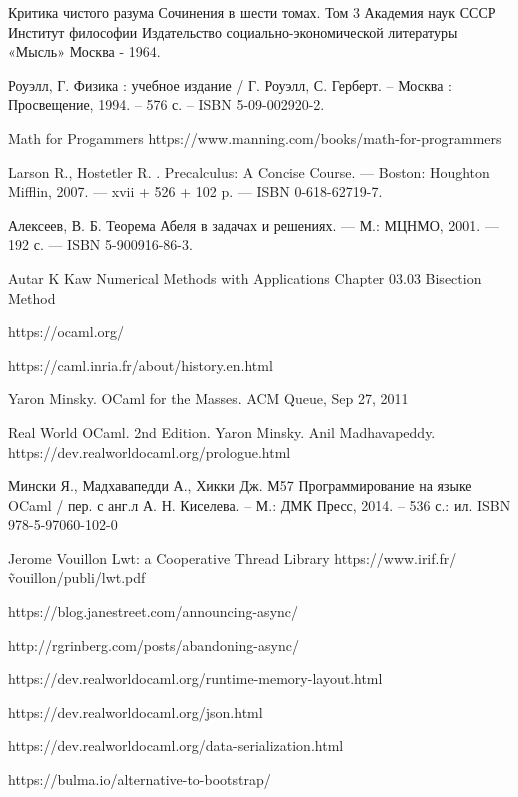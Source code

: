 \begingroup
\renewcommand{\section}[2]{\Anonchapter{Список использованных источников}\vspace{-1em}}
\begin{thebibliography}{00}

    Критика чистого разума
    Сочинения в шести томах.
    Том 3
    Академия наук СССР
    Институт философии
    Издательство социально-экономической литературы
    «Мысль»
    Москва - 1964. \TODO

    Роуэлл, Г. Физика : учебное издание / Г. Роуэлл, С. Герберт. -- Москва : Просвещение, 1994. -- 576 с. -- ISBN 5-09-002920-2.

    Math for Progammers \TODO
    https://www.manning.com/books/math-for-programmers

    Larson R., Hostetler R. . Precalculus: A Concise Course. — Boston:
    Houghton Mifflin, 2007. — xvii + 526 + 102 p. — ISBN 0-618-62719-7. \TODO

    Алексеев, В. Б. Теорема Абеля в задачах и решениях. — М.: МЦНМО, 2001. — 192 с. — ISBN 5-900916-86-3. \TODO

    \TODO Autar K Kaw Numerical Methods with Applications Chapter 03.03 Bisection Method

    https://ocaml.org/ \TODO

    https://caml.inria.fr/about/history.en.html \TODO

    Yaron Minsky. OCaml for the Masses. ACM Queue, Sep 27, 2011 \TODO

    Real World OCaml. 2nd Edition. Yaron Minsky. Anil Madhavapeddy.
    https://dev.realworldocaml.org/prologue.html \TODO

    Мински Я., Мадхавапедди А., Хикки Дж.
    М57 Программирование на языке OCaml / пер. с анг.л А. Н. Киселева. –
    М.: ДМК Пресс, 2014. – 536 с.: ил.
    ISBN 978-5-97060-102-0
    \TODO

    Jerome Vouillon Lwt: a Cooperative Thread Library \TODO
    https://www.irif.fr/\~vouillon/publi/lwt.pdf

    https://blog.janestreet.com/announcing-async/ \TODO

    http://rgrinberg.com/posts/abandoning-async/ \TODO

    https://dev.realworldocaml.org/runtime-memory-layout.html \TODO

    https://dev.realworldocaml.org/json.html \TODO

    https://dev.realworldocaml.org/data-serialization.html \TODO

    https://bulma.io/alternative-to-bootstrap/ \TODO

\end{thebibliography}
\endgroup

